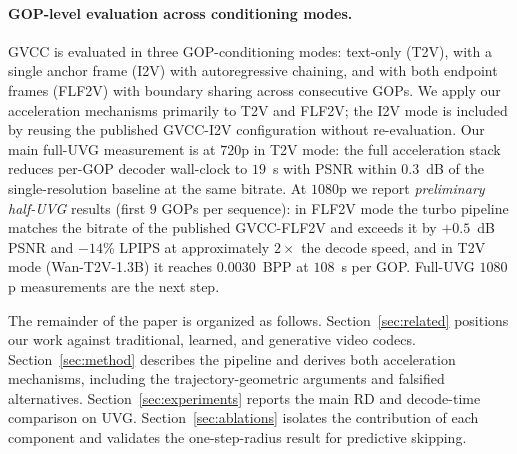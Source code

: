 \paragraph{GOP-level evaluation across conditioning modes.}
GVCC is evaluated in three GOP-conditioning modes: text-only (T2V), with
a single anchor frame (I2V) with autoregressive chaining, and with both
endpoint frames (FLF2V) with boundary sharing across consecutive GOPs.
We apply our acceleration mechanisms primarily to T2V and FLF2V; the
I2V mode is included by reusing the published GVCC-I2V configuration
without re-evaluation. Our main full-UVG measurement is at $720$p in
T2V mode: the full acceleration stack reduces per-GOP decoder
wall-clock to $19$~s with PSNR within $0.3$~dB of the single-resolution
baseline at the same bitrate. At $1080$p we report \emph{preliminary
half-UVG} results (first $9$ GOPs per sequence): in FLF2V mode the
turbo pipeline matches the bitrate of the published GVCC-FLF2V and
exceeds it by $+0.5$~dB PSNR and $-14\%$ LPIPS at approximately
$2\times$ the decode speed, and in T2V mode (Wan-T2V-1.3B) it reaches
$0.0030$~BPP at $108$~s per GOP. Full-UVG $1080$p measurements are the
next step.

The remainder of the paper is organized as follows. Section~\ref{sec:related}
positions our work against traditional, learned, and generative video
codecs. Section~\ref{sec:method} describes the pipeline and derives both
acceleration mechanisms, including the trajectory-geometric arguments and
falsified alternatives. Section~\ref{sec:experiments} reports the main RD
and decode-time comparison on UVG. Section~\ref{sec:ablations} isolates the
contribution of each component and validates the one-step-radius result for
predictive skipping.
